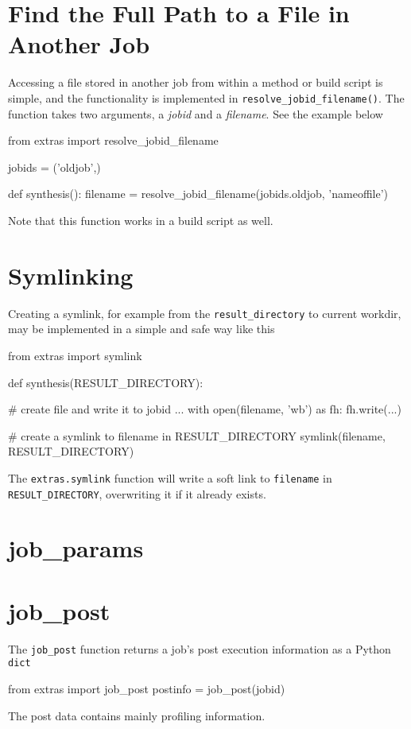 \section{Find the Full Path to a File in Another Job}
Accessing a file stored in another job from within a method or build
script is simple, and the functionality is implemented
in \texttt{resolve\_jobid\_filename()}.  The function takes two
arguments, a \textsl{jobid} and a \textsl{filename}.  See the example
below
\begin{python}
from extras import resolve_jobid_filename

jobids = ('oldjob',)

def synthesis():
    filename = resolve_jobid_filename(jobids.oldjob, 'nameoffile')
\end{python}
Note that this function works in a build script as well.



\section{Symlinking}
\label{sec:symlinking}
Creating a symlink, for example from the \texttt{result\_directory} to
current workdir, may be implemented in a simple and safe way like this
\begin{python}
from extras import symlink

def synthesis(RESULT_DIRECTORY):

    # create file and write it to jobid
    ...
    with open(filename, 'wb') as fh:
        fh.write(...)

    # create a symlink to filename in RESULT_DIRECTORY
    symlink(filename, RESULT_DIRECTORY)
\end{python}
The \texttt{extras.symlink} function will write a soft link
to \texttt{filename} in \texttt{RESULT\_DIRECTORY}, overwriting it if
it already exists.




\section{job\_params}


\section{job\_post}
The \texttt{job\_post} function returns a job's post execution
information as a Python \texttt{dict}
\begin{python}
from extras import job_post
postinfo = job_post(jobid)
\end{python}
The post data contains mainly profiling information.



